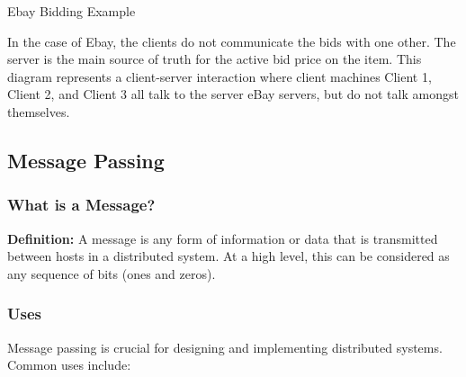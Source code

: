 \begin{example}{Ebay Bidding Example}
\begin{minipage}{0.35\textwidth} %
In the case of Ebay, the clients do not communicate the bids with one other. The server is the main source of truth for the active bid price on the item. This diagram represents a client-server interaction where client machines Client 1, Client 2, and Client 3 all talk to the server eBay servers, but do not talk amongst themselves.
\end{minipage}
\hfill 
\begin{minipage}{0.60\textwidth} %
\end{minipage}	
\end{example}

\subsection{Message Passing}
\subsubsection{What is a Message?}
\textbf{Definition:} A message is any form of information or data that is transmitted between hosts in a distributed system. At a high level, this can be considered as any sequence of bits (ones and zeros).

\subsubsection{Uses}
Message passing is crucial for designing and implementing distributed systems. Common uses include:


